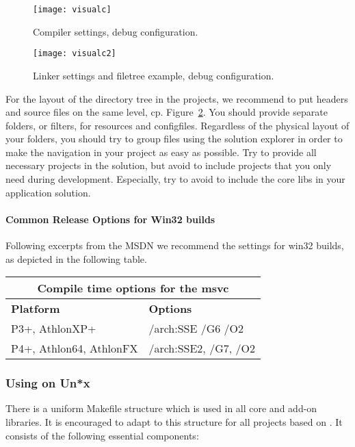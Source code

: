 \begin{figure}
\texttt{[image: visualc]}
\caption{\label{fig:visualc.general}
        \label{fig:visualc.compiler.general}
        \label{fig:visualc.compiler.codegeneration}
        \label{fig:visualc.compiler.precompiled}
        Compiler settings, debug configuration.}
\end{figure}

\begin{figure}
\begin{center}
\texttt{[image: visualc2]}
\end{center}
\caption{\label{fig:visualc.linker.general}
				 \label{fig:visualc_filetree}
         Linker settings and filetree example, debug configuration.}
\end{figure}

For the layout of the directory tree in the projects, we recommend to put headers and source files on the same level, cp. Figure~\ref{fig:visualc_filetree}.
You should provide separate folders, or filters, for resources and configfiles.
Regardless of the physical layout of your folders, you should try to group files using the solution explorer in order to make the navigation in your project as easy as possible.
Try to provide all necessary projects in the solution, but avoid to include projects that you only need during development.
Especially, try to avoid to include the  core libs in your application solution.

\paragraph{Common Release Options for Win32 builds}

Following excerpts from the MSDN we recommend the settings for win32 builds, as depicted in the following table.

\begin{tabular}{|l|p{10cm}|}
\multicolumn{2}{c}{\textbf{Compile time options for the msvc}}\\\hline
\textbf{Platform} & \textbf{Options}  \\\hline
P3+, AthlonXP+ & /arch:SSE /G6 /O2\\\hline
P4+, Athlon64, AthlonFX & /arch:SSE2, /G7, /O2\\\hline
\end{tabular}

\newpage
\subsubsection{Using  on Un*x}\label{ssec:unix}
There is a uniform Makefile structure which is used in all  core and add-on libraries.
It is encouraged to adapt to this structure for all projects based on .
It consists of the following essential components:

